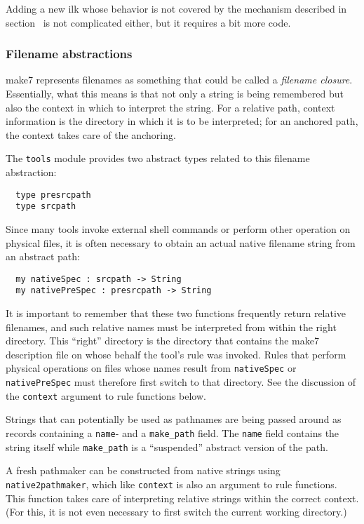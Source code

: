 Adding a new ilk whose behavior is not covered by the mechanism
described in section~ is not complicated
either, but it requires a bit more code.

\subsubsection{Filename abstractions}

make7 represents filenames as something that could be called a {\em
filename closure}.  Essentially, what this means is that not only a
string is being remembered but also the context in which to interpret
the string.  For a relative path, context information is the directory
in which it is to be interpreted; for an anchored path, the context
takes care of the anchoring.

The {\tt tools} module provides two abstract types related to this
filename abstraction:

\begin{verbatim}
  type presrcpath
  type srcpath
\end{verbatim}

Since many tools invoke external shell commands or perform other
operation on physical files, it is often necessary to obtain an actual
native filename string from an abstract path:

\begin{verbatim}
  my nativeSpec : srcpath -> String
  my nativePreSpec : presrcpath -> String
\end{verbatim}

It is important to remember that these two functions frequently return
relative filenames, and such relative names must be interpreted from
within the right directory.  This ``right'' directory is the directory
that contains the make7 description file on whose behalf the tool's rule
was invoked.  Rules that perform physical operations on files whose
names result from {\tt nativeSpec} or {\tt nativePreSpec} must
therefore first switch to that directory.  See the discussion of the
{\tt context} argument to rule functions below.

Strings that can potentially be used as pathnames are being passed
around as records containing a {\tt name}- and a {\tt make_path} field.
The {\tt name} field contains the string itself while {\tt make_path}
is a ``suspended'' abstract version of the path.

A fresh pathmaker can be constructed from native strings using {\tt
native2pathmaker}, which like {\tt context} is also an argument to
rule functions.  This function takes care of interpreting relative
strings within the correct context.  (For this, it is not even
necessary to first switch the current working directory.)


